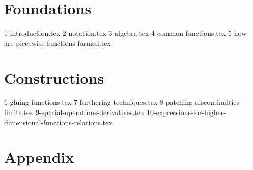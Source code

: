 \documentclass[10pt,a4paper]{article}
\begin{document}
\maketitle
\tableofcontents
\newpage

\part{Foundations}
{1-introduction.tex}
{2-notation.tex}
{3-algebra.tex}
{4-common-functions.tex}
{5-how-are-piecewise-functions-formed.tex}

\part{Constructions}
{6-gluing-functions.tex}
{7-furthering-techniques.tex}
{8-patching-discontinuities-limits.tex}
{9-special-operations-derivatives.tex}
{10-expressions-for-higher-dimensional-functions-relations.tex}

\part{Appendix}
\printglossary[title=Glossary, toctitle=Glossary]
\glsaddallunused
\end{document}
